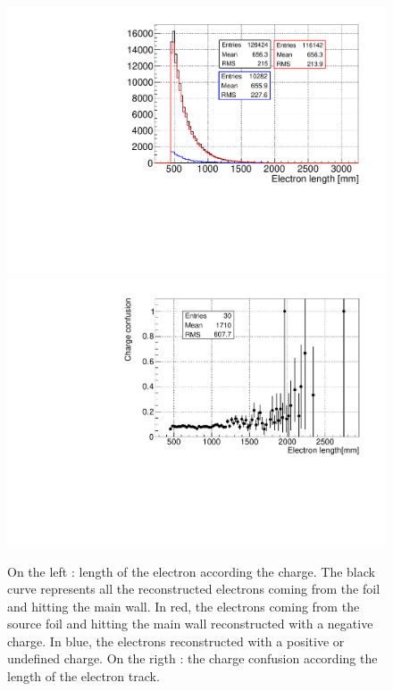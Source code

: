 \documentclass[main.tex]{subfiles}
\begin{document}
\begin{figure}[h!]
\begin{center}
\includegraphics[scale=0.34]{pictures/Chap5/length_source_charge_confusion_2.pdf}
\includegraphics[scale=0.34]{pictures/Chap5/charge_confusion_length_source.pdf}
\caption{On the left : length of the electron according the charge. The black curve represents all the reconstructed electrons coming from the foil and hitting the main wall. In red, the electrons coming from the source foil and hitting the main wall reconstructed with a negative charge. In blue, the electrons reconstructed with a positive or undefined charge. On the rigth : the charge confusion according the length of the electron track.}
\label{charge_confusion_source_plots}
\end{center}
\end{figure}
\end{document}
